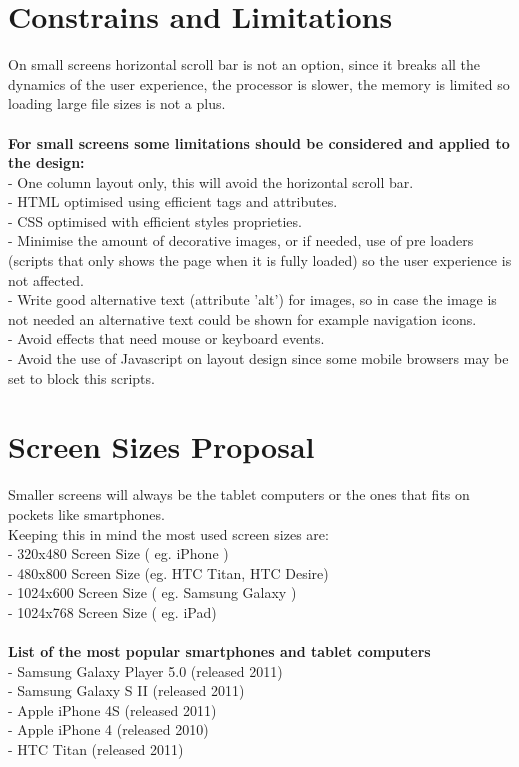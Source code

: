 \section{Constrains and Limitations}
On small screens horizontal scroll bar is not an option, since it breaks all the dynamics of the user experience, the processor is slower, the memory is limited so loading large file sizes is not a plus.\\
\\
\noindent \textbf{For small screens some limitations should be considered and applied to the design:}\\
- One column layout only, this will avoid the horizontal scroll bar.\\
- HTML optimised using efficient tags and attributes.\\
- CSS optimised with efficient styles proprieties.\\
- Minimise the amount of decorative images, or if needed, use of pre loaders (scripts that only shows the page when it is fully loaded) so the user experience is not affected.\\
- Write good alternative text (attribute 'alt')  for images, so in case the image is not needed an alternative text could be shown for example navigation icons.\\
- Avoid effects that need mouse or keyboard events.\\
- Avoid the use of Javascript on layout design since some mobile browsers may be set to block this scripts.

\section{Screen Sizes Proposal}
Smaller screens will always be the tablet computers or the ones that fits on pockets like smartphones.\\
Keeping this in mind the most used screen sizes are:\\
- 320x480 Screen Size ( eg. iPhone )\\ 	%
- 480x800 Screen Size (eg. HTC Titan, HTC Desire)\\ %
- 1024x600 Screen Size ( eg. Samsung Galaxy )\\
- 1024x768 Screen Size ( eg. iPad)\\
\\
\noindent \textbf{List of the most popular smartphones and tablet computers}\\
- Samsung Galaxy Player 5.0 (released 2011)\\
- Samsung Galaxy S II (released 2011)\\
- Apple iPhone 4S (released 2011)\\
- Apple iPhone 4 (released 2010)\\
- HTC Titan (released 2011)\\
